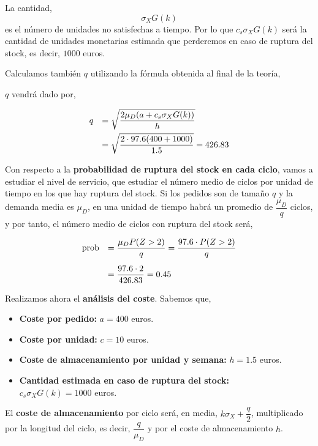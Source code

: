 \documentclass[a4paper,12pt]{article}
\begin{document}
\begin{itemize}
La cantidad, $$ \sigma_X G(k)$$ es el n\'umero de unidades no satisfechas a tiempo. Por lo que $c_s\sigma_X G(k)$ ser\'a la cantidad de unidades monetarias estimada que perderemos en caso de ruptura del stock, es decir, $1000$ euros.

Calculamos tambi\'en $q$ utilizando la f\'ormula obtenida al final de la teor\'ia,

$q$ vendr\'a dado por,

\begin{equation*}
\begin{array}{l l}
q & =  \sqrt{\dfrac{2\mu_D (a + c_s \sigma_X G(k))}{h}} \\[.3cm]
\, & = \sqrt{\dfrac{2\cdot 97.6(400 + 1000)}{1.5}} = 426.83
\end{array}
\end{equation*}

Con respecto a la \textbf{probabilidad de ruptura del stock en cada ciclo}, vamos a estudiar el nivel de servicio, que estudiar el n\'umero medio de ciclos por unidad de tiempo en los que hay ruptura del stock. Si los pedidos son de tama\~no $q$ y la demanda media es $\mu_D$, en una unidad de tiempo habr\'a un promedio de $\dfrac{\mu_D}{q}$ ciclos, y por tanto, el n\'umero medio de ciclos con ruptura del stock ser\'a,

\begin{equation*}
\begin{array}{l l}
\text{prob} & = \dfrac{\mu_D P(Z > 2)}{q} = \dfrac{97.6\cdot P(Z > 2)}{q}\\[.5cm]
\, & = \dfrac{97.6\cdot 2}{426.83} = 0.45
\end{array}
\end{equation*}

Realizamos ahora el \textbf{an\'alisis del coste}. Sabemos que,

\begin{itemize}
\item[] \textbf{Coste por pedido:} $a = 400$ euros.
\item[] \textbf{Coste por unidad:} $c = 10$ euros.
\item[] \textbf{Coste de almacenamiento por unidad y semana:} $h = 1.5$ euros.

\item[] \textbf{Cantidad estimada en caso de ruptura del stock:} \\$c_s \sigma_X G(k) = 1000$ euros.
\end{itemize}

El \textbf{coste de almacenamiento} por ciclo ser\'a, en media, $k\sigma_X + \dfrac{q}{2}$, multiplicado por la longitud del ciclo, es decir, $\dfrac{q}{\mu_D}$ y por el coste de almacenamiento $h$.


\end{itemize}
\end{document}
